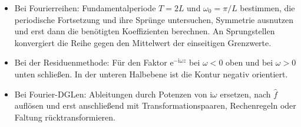 \documentclass[11pt,a4paper]{article}
\newcommand{\ii}{\mathrm i}
\newcommand{\ee}{\mathrm e}
\newcommand{\1}{\mathbf 1}
\begin{document}
{\begin{pruefungsbox}[title=Prüfungsblick: fünfte Prüfungsaufgabe]
\begin{itemize}
\item Bei Fourierreihen: Fundamentalperiode $T=2L$ und
$\omega_0=\pi/L$ bestimmen, die periodische Fortsetzung und ihre Sprünge
untersuchen, Symmetrie ausnutzen und erst dann die benötigten Koeffizienten
berechnen. An Sprungstellen konvergiert die Reihe gegen den Mittelwert der
einseitigen Grenzwerte.

\item Bei der Residuenmethode: Für den Faktor
$\ee^{-\ii\omega z}$ bei $\omega<0$ oben und bei $\omega>0$ unten schließen.
In der unteren Halbebene ist die Kontur negativ orientiert.

\item Bei Fourier-DGLen: Ableitungen durch Potenzen von
$\ii\omega$ ersetzen, nach $\widehat f$ auflösen und erst anschließend mit
Transformationspaaren, Rechenregeln oder Faltung rücktransformieren.

\end{itemize}
\end{pruefungsbox}
}
\end{document}
